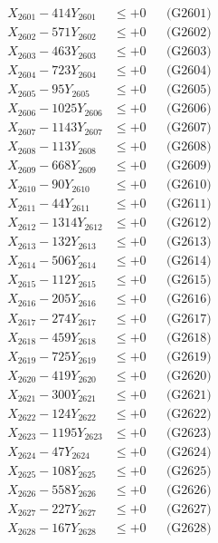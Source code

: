 \documentclass[a4paper,10pt]{article}
\begin{document}
{\begin{align}
\allowbreak
X_{2601} - 414Y_{2601} &\leq +0 && \text{(G2601)} \\
X_{2602} - 571Y_{2602} &\leq +0 && \text{(G2602)} \\
X_{2603} - 463Y_{2603} &\leq +0 && \text{(G2603)} \\
X_{2604} - 723Y_{2604} &\leq +0 && \text{(G2604)} \\
X_{2605} - 95Y_{2605} &\leq +0 && \text{(G2605)} \\
X_{2606} - 1025Y_{2606} &\leq +0 && \text{(G2606)} \\
X_{2607} - 1143Y_{2607} &\leq +0 && \text{(G2607)} \\
X_{2608} - 113Y_{2608} &\leq +0 && \text{(G2608)} \\
X_{2609} - 668Y_{2609} &\leq +0 && \text{(G2609)} \\
X_{2610} - 90Y_{2610} &\leq +0 && \text{(G2610)} \\
\allowbreak
X_{2611} - 44Y_{2611} &\leq +0 && \text{(G2611)} \\
X_{2612} - 1314Y_{2612} &\leq +0 && \text{(G2612)} \\
X_{2613} - 132Y_{2613} &\leq +0 && \text{(G2613)} \\
X_{2614} - 506Y_{2614} &\leq +0 && \text{(G2614)} \\
X_{2615} - 112Y_{2615} &\leq +0 && \text{(G2615)} \\
X_{2616} - 205Y_{2616} &\leq +0 && \text{(G2616)} \\
X_{2617} - 274Y_{2617} &\leq +0 && \text{(G2617)} \\
X_{2618} - 459Y_{2618} &\leq +0 && \text{(G2618)} \\
X_{2619} - 725Y_{2619} &\leq +0 && \text{(G2619)} \\
X_{2620} - 419Y_{2620} &\leq +0 && \text{(G2620)} \\
\allowbreak
X_{2621} - 300Y_{2621} &\leq +0 && \text{(G2621)} \\
X_{2622} - 124Y_{2622} &\leq +0 && \text{(G2622)} \\
X_{2623} - 1195Y_{2623} &\leq +0 && \text{(G2623)} \\
X_{2624} - 47Y_{2624} &\leq +0 && \text{(G2624)} \\
X_{2625} - 108Y_{2625} &\leq +0 && \text{(G2625)} \\
X_{2626} - 558Y_{2626} &\leq +0 && \text{(G2626)} \\
X_{2627} - 227Y_{2627} &\leq +0 && \text{(G2627)} \\
X_{2628} - 167Y_{2628} &\leq +0 && \text{(G2628)} \\

\end{align}}
\end{document}
